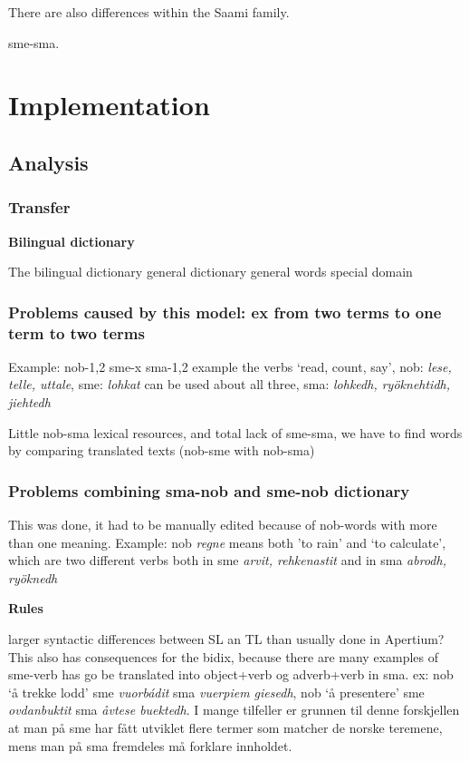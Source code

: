 \documentclass[a4paper,11pt,twocolumn]{article}
\begin{document}
There are also differences within the Saami family.

sme-sma.




\section{Implementation}

\subsection{Analysis}

\subsubsection{Transfer}


\textbf{Bilingual dictionary}


The bilingual dictionary
general dictionary
general words
special domain

\subsubsection{Problems caused by this model: ex from two terms to one term to two terms}

Example: nob-1,2   sme-x   sma-1,2
example the verbs ‘read, count, say’, nob: \textit{lese, telle, uttale}, sme: \textit{lohkat} can be used about all three, sma: \textit{lohkedh, ryöknehtidh, jiehtedh} 

Little nob-sma lexical resources, and total lack of sme-sma, we have to find words by comparing translated texts (nob-sme with nob-sma)

\subsubsection{Problems combining sma-nob and sme-nob dictionary}
This was done, it had to be manually edited because of nob-words with more than one meaning. 
Example: nob \textit{regne} means both 'to rain' and ‘to calculate’, 
which are two different verbs both in sme \textit{arvit, rehkenastit} and in sma \textit{abrodh, ryöknedh}

\textbf{Rules}

larger syntactic differences between SL an TL than usually done in Apertium? \\
This also has consequences for the bidix, because there are many examples of sme-verb has go be translated into object+verb og adverb+verb in sma.
ex: nob ‘å trekke lodd’ sme \textit{vuorbádit} sma \textit{vuerpiem giesedh}, 
nob ‘å presentere’ sme \textit{ovdanbuktit} sma \textit{åvtese buektedh}. 
I mange tilfeller er grunnen til denne  forskjellen at man på sme har fått utviklet flere termer som matcher de norske teremene, mens man på sma
fremdeles må forklare innholdet.
\end{document}
